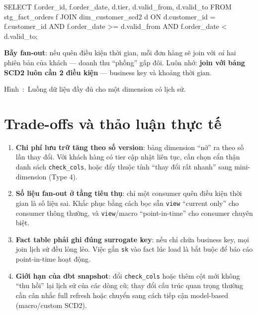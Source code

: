 \documentclass[12pt]{article}
\newcounter{hinh}
\newcommand{\capfig}[1]{%
  \refstepcounter{hinh}%
    Hình~\thehinh:~#1
}
\begin{document}
\begin{aivnsqlbox}
SELECT
    f.order_id,
    f.order_date,
    d.tier,
    d.valid_from,
    d.valid_to
FROM stg_fact_orders f
JOIN dim_customer_scd2 d
  ON d.customer_id = f.customer_id
 AND f.order_date >= d.valid_from
 AND f.order_date <  d.valid_to;
\end{aivnsqlbox}

\begin{notebox}
\textbf{Bẫy fan-out}: nếu quên điều kiện thời gian, mỗi đơn hàng sẽ join với \emph{cả} hai phiên bản của khách --- doanh thu ``phồng'' gấp đôi. Luôn nhớ: \textbf{join với bảng SCD2 luôn cần 2 điều kiện} --- business key và khoảng thời gian.
\end{notebox}



\begin{figurecaptionmodern}
\capfig{Luồng dữ liệu đầy đủ cho một dimension có lịch sử.}
\end{figurecaptionmodern}

\section{Trade-offs và thảo luận thực tế}

\begin{enumerate}
    \item \textbf{Chi phí lưu trữ tăng theo số version}: bảng dimension ``nở'' ra theo số lần thay đổi. Với khách hàng có tier cập nhật liên tục, cần chọn cẩn thận danh sách \texttt{check\_cols}, hoặc đẩy thuộc tính ``thay đổi rất nhanh'' sang mini-dimension (Type 4).
    \item \textbf{Số liệu fan-out ở tầng tiêu thụ}: chỉ một consumer quên điều kiện thời gian là số liệu sai. Khắc phục bằng cách bọc sẵn \texttt{view} ``current only'' cho consumer thông thường, và \texttt{view}/macro ``point-in-time'' cho consumer chuyên biệt.
    \item \textbf{Fact table phải ghi đúng surrogate key}: nếu chỉ chứa business key, mọi join lịch sử đều lỏng lẻo. Việc gắn \texttt{sk} vào fact lúc load là bắt buộc để báo cáo point-in-time hoạt động.
    \item \textbf{Giới hạn của dbt snapshot}: đổi \texttt{check\_cols} hoặc thêm cột mới không ``thu hồi'' lại lịch sử của các dòng cũ; thay đổi cấu trúc quan trọng thường cần cân nhắc full refresh hoặc chuyển sang cách tiếp cận model-based (macro/custom SCD2).
\end{enumerate}
\end{document}
